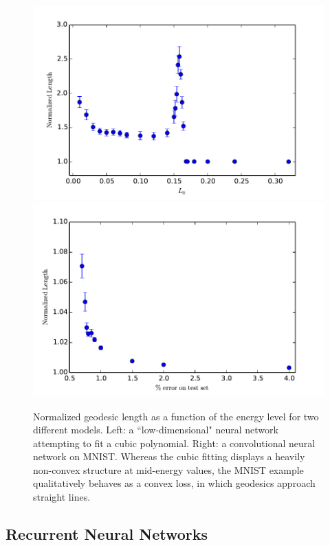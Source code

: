\begin{figure}
\label{figurelength}
\centering
\includegraphics[width=.4\textwidth]{../Plots/normlengthcubics}
\includegraphics[width=.4\textwidth]{../Plots/normlengthMNIST}
\caption{Normalized geodesic length as a function of the energy level for two different models. Left: a ``low-dimensional" neural network 
attempting to fit a cubic polynomial. Right: a convolutional neural network on MNIST. Whereas the cubic fitting displays a heavily non-convex structure 
at mid-energy values, the MNIST example qualitatively behaves as a convex loss, in which geodesics approach straight lines.}
\end{figure}

\subsection{Recurrent Neural Networks}


